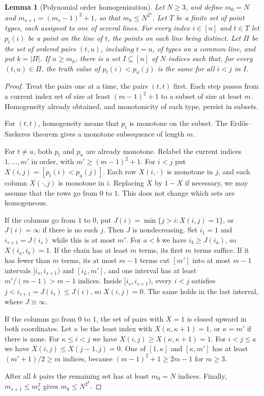 \documentclass[11pt]{article}
\numberwithin{equation}{section}
\theoremstyle{plain}
\newtheorem{lemma}[theorem]{Lemma}
\theoremstyle{definition}
\theoremstyle{remark}
\theoremstyle{plain}
\begin{document}
\begin{lemma}[Polynomial order homogenization]
\label{lem:order-homogenize-v82}
Let $N\ge3$, and define $m_0=N$ and
$m_{s+1}=(m_s-1)^2+1$, so that $m_k\le N^{2^k}$.
Let $T$ be a finite set of point types, each assigned to
one of several lines.  For every index $i\in[n]$ and
$t\in T$ let $p_t(i)$ be a point on the line of $t$, the
points on each line being distinct.  Let $\Pi$ be the set
of ordered pairs $(t,u)$, including $t=u$, of types on a
common line, and put $k=|\Pi|$.  If $n\ge m_k$, there is a
set $I\subseteq[n]$ of $N$ indices such that, for every
$(t,u)\in\Pi$, the truth value of $p_t(i)<p_u(j)$ is the
same for all $i<j$ in $I$.
\end{lemma}
\begin{proof}
Treat the pairs one at a time, the pairs $(t,t)$ first.
Each step passes from a current index set of size at least
$(m-1)^2+1$ to a subset of size at least $m$.  Homogeneity
already obtained, and monotonicity of each type, persist
in subsets.

For $(t,t)$, homogeneity means that $p_t$ is monotone on
the subset.  The Erd\H{o}s--Szekeres theorem gives a
monotone subsequence of length $m$.

For $t\ne u$, both $p_t$ and $p_u$ are already monotone.
Relabel the current indices $1,\ldots,m'$ in order, with
$m'\ge(m-1)^2+1$.  For $i<j$ put
$X(i,j)=[p_t(i)<p_u(j)]$.  Each row $X(i,\cdot)$ is
monotone in $j$, and each column $X(\cdot,j)$ is monotone
in $i$.  Replacing $X$ by $1-X$ if necessary, we may
assume that the rows go from $0$ to $1$.  This does not
change which sets are homogeneous.

If the columns go from $1$ to $0$, put
$J(i)=\min\{j>i:X(i,j)=1\}$, or $J(i)=\infty$ if there is
no such $j$.  Then $J$ is nondecreasing.  Set $i_1=1$ and
$i_{s+1}=J(i_s)$ while this is at most $m'$.  For $a<b$
we have $i_b\ge J(i_a)$, so $X(i_a,i_b)=1$.  If the chain
has at least $m$ terms, its first $m$ terms suffice.
If it has fewer than $m$ terms, its at most $m-1$ terms cut
$[m']$ into at most $m-1$ intervals
$[i_s,i_{s+1})$ and $[i_L,m']$, and one interval has at
least $m'/(m-1)>m-1$ indices.  Inside $[i_s,i_{s+1})$,
every $i<j$ satisfies $j<i_{s+1}=J(i_s)\le J(i)$, so
$X(i,j)=0$.  The same holds in the last interval,
where $J\equiv\infty$.

If the columns go from $0$ to $1$, the set of pairs with
$X=1$ is closed upward in both coordinates.  Let $\kappa$
be the least index with $X(\kappa,\kappa+1)=1$, or
$\kappa=m'$ if there is none.  For $\kappa\le i<j$ we have
$X(i,j)\ge X(\kappa,\kappa+1)=1$.  For $i<j\le\kappa$ we
have $X(i,j)\le X(j-1,j)=0$.  One of $[1,\kappa]$ and
$[\kappa,m']$ has at least $(m'+1)/2\ge m$ indices,
because $(m-1)^2+1\ge2m-1$ for $m\ge3$.

After all $k$ pairs the remaining set has at least
$m_0=N$ indices.  Finally,
$m_{s+1}\le m_s^2$ gives $m_k\le N^{2^k}$.
\end{proof}
\end{document}
